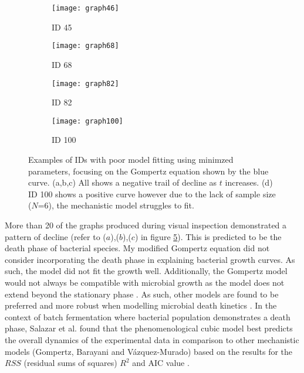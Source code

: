 \documentclass[11pt]{article}
\begin{document}
\begin{figure}[ht]
    \begin{subfigure}[b]{0.5\linewidth}
        \centering
        \texttt{[image: graph46]}
        \caption{ID 45}
        \label{fig3:a}
        \vspace{4ex}
    \end{subfigure}%
    \begin{subfigure}[b]{0.5\linewidth}
        \centering
        \texttt{[image: graph68]}
        \caption{ID 68}
        \label{fig3:b}
        \vspace{4ex}
    \end{subfigure}
    \begin{subfigure}[b]{0.5\linewidth}
        \centering
        \texttt{[image: graph82]}
        \caption{ID 82}
        \label{fig3:c}
        \vspace{4ex}
    \end{subfigure}%
    \begin{subfigure}[b]{0.5\linewidth}
        \centering
        \texttt{[image: graph100]}
        \caption{ID 100}
        \label{fig3:d}
        \vspace{4ex}  
    \end{subfigure}
    \caption{Examples of IDs with poor model fitting using minimzed parameters, focusing on the Gompertz equation shown by the blue curve. (a,b,c) All shows a negative trail of decline as $t$ increases. 
    (d) ID 100 shows a positive curve however due to the lack of sample size ($N$=6), the mechanistic model struggles to fit.}
    \label{fig:fig3}
\end{figure}

More than 20 of the graphs produced during visual inspection demonstrated a pattern of decline (refer to ($a$),($b$),($c$) in figure \ref{fig:fig3}). This is predicted to be the death phase of 
bacterial species. My modified Gompertz equation did not consider incorporating the death phase in explaining bacterial growth curves. As such, 
the model did not fit the growth well. Additionally, the Gompertz model would not always be compatible
with microbial growth as the model does not extend beyond the stationary phase \cite{gibson_predicting_1988,xiong_comparison_1999}. As such, other models are found to be preferred and more
robust when modelling microbial death kinetics \cite{xiong_comparison_1999}. In the context of batch fermentation where bacterial population demonstrates a death phase,
Salazar et al. found that the phenomenological cubic model best predicts the overall dynamics of the experimental data in comparison to other mechanistic
models (Gompertz, Barayani and Vázquez-Murado) based on the results for the $RSS$ (residual sums of squares) $R^{2}$ and AIC value \cite{salazar_primary_2021}.
\end{document}
